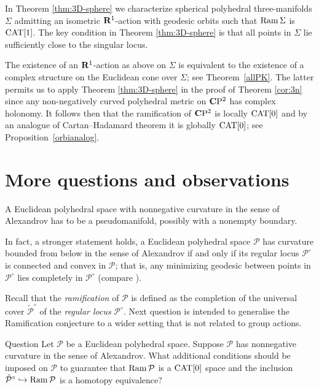 \documentclass{compositio}
\begin{document}
In Theorem \ref{thm:3D-sphere} we  characterize  spherical polyhedral three-manifolds $\Sigma$
admitting an isometric $\mathbf{R}^1$-action with geodesic orbits such that $\mathop{\rm Ram}\nolimits\Sigma$ is $\mathrm{CAT}[1]$.
The key condition in Theorem \ref{thm:3D-sphere} is that all points in $\Sigma$  lie sufficiently close to the singular locus.

The existence of an $\mathbf{R}^1$-action as above on $\Sigma$ is equivalent to the existence of
a complex structure on the Euclidean cone over $\Sigma$;
see Theorem~\ref{allPK}. 
The latter permits us to apply Theorem \ref{thm:3D-sphere} in the proof of Theorem \ref{cor:3n}
since any non-negatively curved polyhedral metric on $\mathbf{C}\mathrm{P}^2$ has complex holonomy.
It follows then that the ramification of $\mathbf{C}\mathrm{P}^2$ is locally $\mathrm{CAT}[0]$ and by an analogue of Cartan--Hadamard theorem it is globally $\mathrm{CAT}[0]$;
see Proposition~\ref{orbianalog}.





\section{More questions and observations}\label{sec:questions}

A Euclidean polyhedral space with
nonnegative curvature in the sense of Alexandrov has to be a pseudomanifold, possibly with a nonempty boundary.

In fact, a stronger statement holds,
a Euclidean polyhedral space $\mathcal{P}$
has curvature bounded from below in the sense of Alexandrov
if and only if
its regular locus $\mathcal{P}^\circ$
is connected and convex in $\mathcal{P}$;
that is, any minimizing geodesic between points in $\mathcal{P}^\circ$ lies completely in $\mathcal{P}^\circ$ (compare \cite[Theorem 5]{milka}).

Recall that the {\it ramification} of $\mathcal{P}$
is defined as the  completion of the universal cover $\tilde {\mathcal{P}}^\circ$ of the \emph{regular locus} $\mathcal{P}^\circ$.
Next question is intended to generalise the Ramification conjecture 
to a wider setting that is not related to group actions.


\begin{thm}{Question}\label{quest:generalized}
Let $\mathcal{P}$ be a Euclidean polyhedral space. Suppose $\mathcal{P}$ has nonnegative curvature in the sense of Alexandrov.
What additional conditions should be imposed on $\mathcal{P}$  to guarantee that $\mathop{\rm Ram}\nolimits \mathcal{P}$ is a $\mathrm{CAT}[0]$ space
and the inclusion $\tilde{\mathcal{P}}^\circ\hookrightarrow\mathop{\rm Ram}\nolimits \mathcal{P}$ is a homotopy equivalence?
\end{thm}
\end{document}
